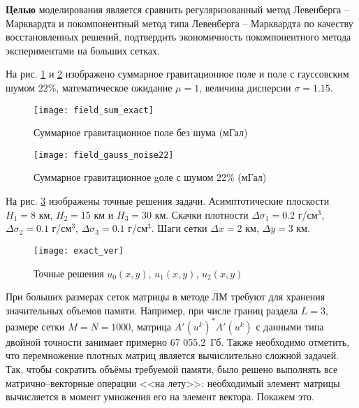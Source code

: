 {\bfseries Целью} моделирования является сравнить регуляризованный метод Левенберга -- Марквардта и покомпонентный метод типа Левенберга -- Марквардта по качеству восстановленных решений, подтвердить экономичность покомпонентного метода экспериментами на больших сетках.

На рис. \ref{fig:field_sum_exact} и \ref{fig:field_gauss_noise22} изображено суммарное гравитационное поле и поле с гауссовским шумом 22\%, математическое ожидание $\mu=1$, величина дисперсии $\sigma=1.15$. 
\begin{figure}[H]
	\centering
	\texttt{[image: field\_sum\_exact]}
	\caption{Суммарное гравитационное поле без шума (мГал)}
	\label{fig:field_sum_exact}
\end{figure}
\begin{figure}[H]
	\centering
	\texttt{[image: field\_gauss\_noise22]}
	\caption{Суммарное гравитационное gоле с шумом 22\% (мГал)}
	\label{fig:field_gauss_noise22}
\end{figure}

На рис. \ref{fig:exact_ver} изображены точные решения задачи. Асимптотические плоскости $H_1=8$ км, $H_2=15$ км и $H_3=30$ км. Скачки плотности $\Delta\sigma_1=0.2$ г/см$^3$, $\Delta\sigma_2=0.1$ г/см$^3$, $\Delta\sigma_3=0.1$ г/см$^3$. Шаги сетки $\Delta x=2$ км, $\Delta y=3$ км.
\begin{figure}[H]
	\centering
	\texttt{[image: exact\_ver]}
	\caption{Точные решения $u_0(x,y)$, $u_1(x,y)$, $u_2(x,y)$}
	\label{fig:exact_ver}
\end{figure}

При больших размерах сеток матрицы в методе ЛМ требуют для хранения значительных объемов памяти. Например, при числе границ раздела $L=3$, размере сетки $M=N=1000$, матрица $A'(u^k)^*A'(u^k)$ с данными типа двойной точности занимает примерно  67 055.2~Гб. Также необходимо отметить, что перемножение плотных матриц является вычислительно сложной задачей. Так, чтобы сократить объёмы требуемой памяти, было решено выполнять все матрично--векторные операции <<на лету>>: необходимый элемент матрицы вычисляется в момент умножения его на элемент вектора. Покажем это.


